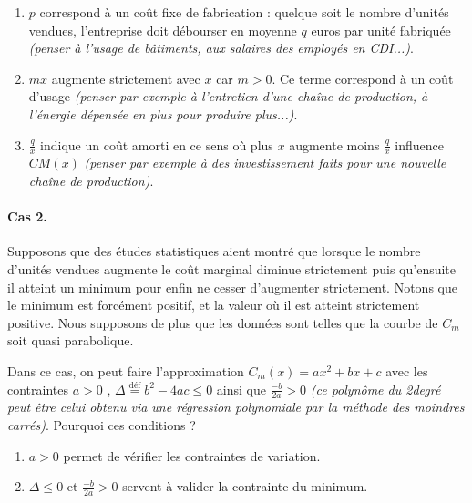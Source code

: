 \begin{enumerate}
	\item $p$ correspond à un coût fixe de fabrication : quelque soit le nombre d'unités vendues, l'entreprise doit débourser en moyenne $q$ euros par unité fabriquée 
	\emph{(penser à l'usage de bâtiments, aux salaires des employés en CDI...)}.


	\item $mx$ augmente strictement avec $x$ car $m > 0$. Ce terme correspond à un coût d'usage
	\emph{(penser par exemple à l'entretien d'une chaîne de production, à l'énergie dépensée en plus pour produire plus...)}.


	\item $\frac{q}{x}$ indique un coût amorti en ce sens où plus $x$ augmente moins $\frac{q}{x}$ influence $CM(x)$
	\emph{(penser par exemple à des investissement faits pour une nouvelle chaîne de production)}.
\end{enumerate}




\paragraph{Cas 2.}


Supposons que des études statistiques aient montré que lorsque le nombre d'unités vendues augmente le coût marginal diminue strictement puis qu'ensuite il atteint un minimum pour enfin ne cesser d'augmenter strictement.
Notons que le minimum est forcément positif, et la valeur où il est atteint strictement positive.
Nous supposons de plus que les données sont telles que la courbe de $C_m$ soit quasi parabolique.


\medskip


Dans ce cas, on peut faire l'approximation $C_m(x) = ax^2 + bx + c$ avec les contraintes $a > 0$ , $\Delta \stackrel{\text{déf}}{=} b^2 - 4ac \leq 0$ ainsi que $\frac{-b}{2a} > 0$ \emph{(ce polynôme du 2\ieme degré peut être celui obtenu via une régression polynomiale par la méthode des moindres carrés)}. Pourquoi ces conditions ?

\begin{enumerate}
	\item $a > 0$ permet de vérifier les contraintes de variation.


	\item $\Delta \leq 0$ et $\frac{-b}{2a} > 0$ servent à valider la contrainte du minimum.
\end{enumerate}


